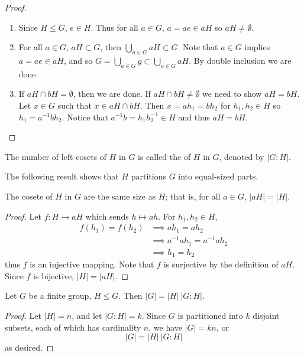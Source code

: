 \begin{proof} \
\begin{enumerate}[label=(\roman*)]
\item Since $H\le G$, $e\in H$. Thus for all $a\in G$, $a=ae\in aH$ so $aH\neq\emptyset$.
\item For all $a\in G$, $aH\subset G$, then $\bigcup_{a\in G}aH\subset G$. Note that $a\in G$ implies $a=ae\in aH$, and so $G=\bigcup_{a\in G}g\subset\bigcup_{a\in G}aH$. By double inclusion we are done.
\item If $aH\cap bH=\emptyset$, then we are done. If $aH\cap bH\neq\emptyset$ we need to show $aH=bH$. Let $x\in G$ such that $x\in aH\cap bH$. Then $x=ah_1=bh_2$ for $h_1,h_2\in H$ so $h_1=a^{-1}bh_2$. Notice that $a^{-1}b=h_1h_2^{-1}\in H$ and thus $aH=bH$.
\end{enumerate}
\end{proof}

\begin{definition}[Index]
The number of left cosets of $H$ in $G$ is called the  of $H$ in $G$, denoted by $|G:H|$.
\end{definition}

The following result shows that $H$ partitions $G$ into equal-sized parts.

\begin{lemma}
The cosets of $H$ in $G$ are the same size as $H$; that is, for all $a\in G$, $|aH|=|H|$.
\end{lemma}

\begin{proof}
Let $f:H\to aH$ which sends $h\mapsto ah$. For $h_1,h_2\in H$,
\begin{align*}
f(h_1)=f(h_2)
&\implies ah_1=ah_2\\
&\implies a^{-1}ah_1=a^{-1}ah_2\\
&\implies h_1=h_2
\end{align*}
thus $f$ is an injective mapping. Note that $f$ is surjective by the definition of $aH$. Since $f$ is bijective, $|H|=|aH|$.
\end{proof}

\begin{theorem}
Let $G$ be a finite group, $H\le G$. Then $|G|=|H|\:|G:H|$.
\end{theorem}

\begin{proof}
Let $|H|=n$, and let $|G:H|=k$. Since $G$ is partitioned into $k$ disjoint subsets, each of which has cardinality $n$, we have $|G|=kn$, or
\[|G|=|H|\:|G:H|\]
as desired.
\end{proof}

